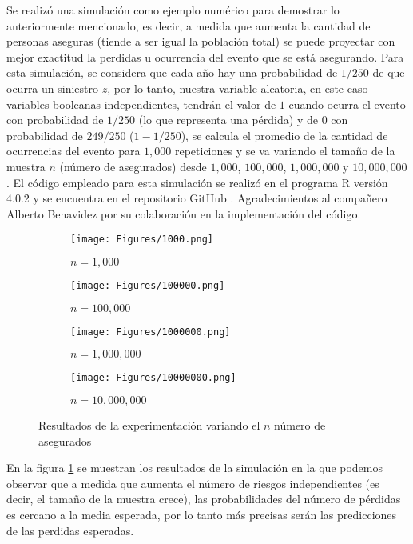 \documentclass{article}
\begin{document}
Se realizó una simulación como ejemplo numérico para demostrar lo anteriormente mencionado, es decir, a medida que aumenta la cantidad de personas aseguras (tiende a ser igual la población total) se puede proyectar con mejor exactitud la perdidas u ocurrencia del evento que se está asegurando. Para esta simulación, se considera que cada año hay una probabilidad de $1/250$ de que ocurra un siniestro $z$, por lo tanto, nuestra variable aleatoria, en este caso variables booleanas independientes, tendrán el valor de $1$ cuando ocurra el evento con probabilidad de $1/250$ (lo que representa una pérdida) y de $0$ con probabilidad de $249/250$ ($1-1/250$), se calcula el promedio de la cantidad de ocurrencias del evento para $1,000$ repeticiones y se va variando el tamaño de la muestra $n$ (número de asegurados) desde $1,000$, $100,000$, $1,000,000$ y $10,000,000$ \cite{notasdeclaseinsurance}. El código empleado para esta simulación se realizó en el programa R versión 4.0.2 \cite{r} y se encuentra en el repositorio GitHub \cite{github}. Agradecimientos al compañero Alberto Benavidez por su colaboración en la implementación del código.

\begin{figure}[h]
    \begin{center}
    \captionsetup{justification=centering}
    \begin{subfigure}[b]{0.5\textwidth}
        \texttt{[image: Figures/1000.png]}
        \caption{$n=1,000$}
    \end{subfigure}
    \begin{subfigure}[b]{0.4\textwidth}
        \texttt{[image: Figures/100000.png]}
        \caption{$n=100,000$}
    \end{subfigure}
        \begin{subfigure}[b]{0.5\textwidth}
        \texttt{[image: Figures/1000000.png]}
        \caption{$n=1,000,000$}
    \end{subfigure}
    \begin{subfigure}[b]{0.4\textwidth}
        \texttt{[image: Figures/10000000.png]}
        \caption{$n=10,000,000$}
    \end{subfigure}
    \caption{Resultados de la experimentación variando el $n$ número de asegurados}
    \label{resultados}
    \end{center}
\end{figure}

En la figura \ref{resultados} se muestran los resultados de la simulación en la que podemos observar que a medida que aumenta el número de riesgos independientes (es decir, el tamaño de la muestra crece), las probabilidades del número de pérdidas es cercano a la media esperada, por lo tanto más precisas serán las predicciones de las perdidas esperadas.




\end{document}
